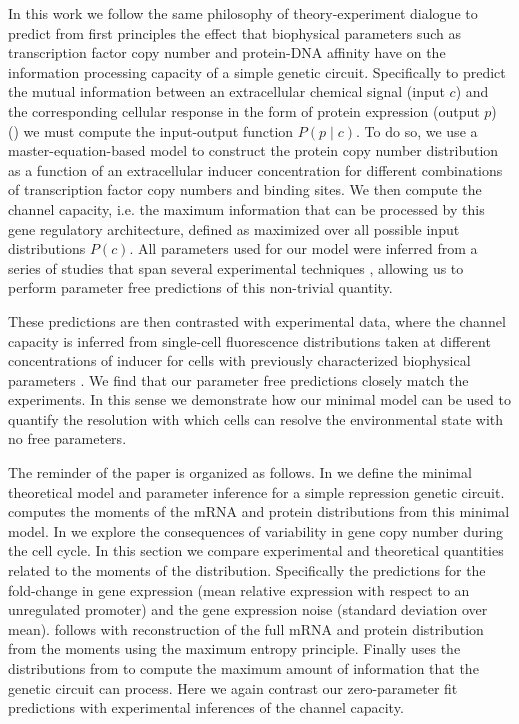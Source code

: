 In this work we follow the same philosophy of theory-experiment dialogue to
predict from first principles the effect that biophysical parameters such as
transcription factor copy number and protein-DNA affinity have on the
information processing capacity of a simple genetic circuit. Specifically to
predict the mutual information between an extracellular chemical signal (input
$c$) and the corresponding cellular response in the form of protein expression
(output $p$) () we must compute the input-output function
$P(p \mid c)$. To do so, we use a master-equation-based model to construct the
protein copy number distribution as a function of an extracellular inducer
concentration for different combinations of transcription factor copy numbers
and binding sites. We then compute the channel capacity, i.e. the maximum
information that can be processed by this gene regulatory architecture, defined
as  maximized over all possible input distributions $P(c)$.
All parameters used for our model were inferred from a series of studies that
span several experimental techniques \cite{Garcia2011c, Brewster2012,
Jones2014a, Brewster2014, Razo-Mejia2018}, allowing us to perform parameter free
predictions of this non-trivial quantity. 

These predictions are then contrasted with experimental data, where the channel
capacity is inferred from single-cell fluorescence distributions taken at
different concentrations of inducer for cells with previously characterized
biophysical parameters \cite{Garcia2011c, Razo-Mejia2018}. We find that our
parameter free predictions closely match the experiments. In this sense we
demonstrate how our minimal model can be used to quantify the resolution with
which cells can resolve the environmental state with no free parameters.

The reminder of the paper is organized as follows. In  we
define the minimal theoretical model and parameter inference for a simple
repression genetic circuit.  computes the moments of the
mRNA and protein distributions from this minimal model. In
 we explore the consequences of variability in gene copy
number during the cell cycle. In this section we compare experimental and
theoretical quantities related to the moments of the distribution. Specifically
the predictions for the fold-change in gene expression (mean relative expression
with respect to an unregulated promoter) and the gene expression noise (standard
deviation over mean).  follows with reconstruction of the
full mRNA and protein distribution from the moments using the maximum entropy
principle. Finally  uses the distributions from
 to compute the maximum amount of information that the
genetic circuit can process. Here we again contrast our zero-parameter fit
predictions with experimental inferences of the channel capacity.


